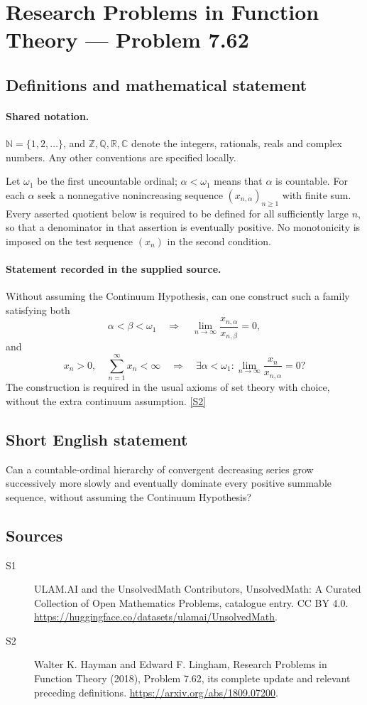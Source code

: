 \documentclass[11pt]{article}
\newcommand{\sref}[2]{\hyperlink{source:#1:#2}{[S#2]}}
\begin{document}
\section{Research Problems in Function Theory — Problem 7.62}\label{statement}

\subsection{Definitions and mathematical statement}

\paragraph{Shared notation.}$\mathbb N=\{1,2,\ldots\}$, and $\mathbb Z,\mathbb Q,\mathbb R,\mathbb C$ denote the integers, rationals, reals and complex numbers. Any other conventions are specified locally.


Let $\omega_1$ be the first uncountable ordinal; $\alpha<\omega_1$ means that $\alpha$ is countable. For each $\alpha$ seek a nonnegative nonincreasing sequence $(x_{n,\alpha})_{n\ge1}$ with finite sum. Every asserted quotient below is required to be defined for all sufficiently large $n$, so that a denominator in that assertion is eventually positive. No monotonicity is imposed on the test sequence $(x_n)$ in the second condition.
\paragraph{Statement recorded in the supplied source.}
Without assuming the Continuum Hypothesis, can one construct such a family satisfying both
\[\alpha<\beta<\omega_1\quad\Longrightarrow\quad
\lim_{n\to\infty}\frac{x_{n,\alpha}}{x_{n,\beta}}=0,
\]
and
\[x_n>0,\quad\sum_{n=1}^\infty x_n<\infty
\quad\Longrightarrow\quad
\exists\alpha<\omega_1:\lim_{n\to\infty}\frac{x_n}{x_{n,\alpha}}=0?
\]
The construction is required in the usual axioms of set theory with choice, without the extra continuum assumption. \sref{statement}{2}
\subsection{Short English statement}
Can a countable-ordinal hierarchy of convergent decreasing series grow successively more slowly and eventually dominate every positive summable sequence, without assuming the Continuum Hypothesis?
\subsection{Sources}
\begin{description}
\item[\hypertarget{source:statement:1}{S1}] ULAM.AI and the UnsolvedMath Contributors, UnsolvedMath: A Curated Collection of Open Mathematics Problems, catalogue entry. CC BY 4.0. \url{https://huggingface.co/datasets/ulamai/UnsolvedMath}.
\item[\hypertarget{source:statement:2}{S2}] Walter K. Hayman and Edward F. Lingham, Research Problems in Function Theory (2018), Problem 7.62, its complete update and relevant preceding definitions. \url{https://arxiv.org/abs/1809.07200}.
\end{description}
\label{end:statement}
\end{document}
